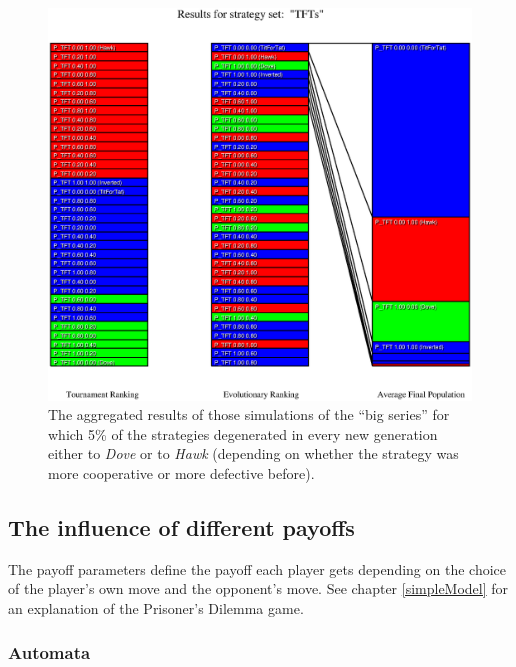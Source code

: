 \begin{figure}
\begin{center}
\includegraphics[width=20cm]{tables/TFTs_D0.050.eps}
\caption{\label{TFTs_D0050} The aggregated results of those
simulations of the ``big series'' for which 5\% of the strategies degenerated
in every new generation either to {\em Dove} or to {\em Hawk} (depending on
whether the strategy was more cooperative or more defective before).}
\end{center}
\end{figure}


\newpage
\subsection{The influence of different payoffs}

The payoff parameters define the payoff each player gets depending on the
choice of the player's own move and the opponent's move. See chapter
\ref{simpleModel} for an explanation of the Prisoner's Dilemma game.

\subsubsection{Automata}
\begin{small}

\end{small}

